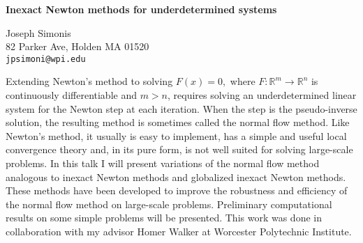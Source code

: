 \documentclass{report}
\newcommand{\Reals}{\mathbb{R}}
\begin{document}

\begin{center}
{\large
{\bf Inexact Newton methods for underdetermined systems}}

	Joseph Simonis \\
	82 Parker Ave,  Holden MA 01520 \\
	{\tt jpsimoni@wpi.edu}
\end{center}
Extending Newton's method to solving $F(x)=0,$ where
$F:\Reals^m\rightarrow\Reals^n$ is continuously
differentiable and $m>n$, requires solving an
underdetermined linear system for the Newton step at each
iteration. When the step is the pseudo-inverse solution, the
resulting method is sometimes called the normal flow method.
Like Newton's method, it usually is easy to implement, has a
simple and useful local convergence theory and, in its pure
form, is not well suited for solving large-scale problems.
In this talk I will present variations of the normal flow
method analogous to inexact Newton methods and globalized
inexact Newton methods. These methods have been developed to
improve the robustness and efficiency of the normal flow
method on large-scale problems. Preliminary computational
results on some simple problems will be presented. This work
was done in collaboration with my advisor Homer Walker at
Worcester Polytechnic Institute.



\end{document}
